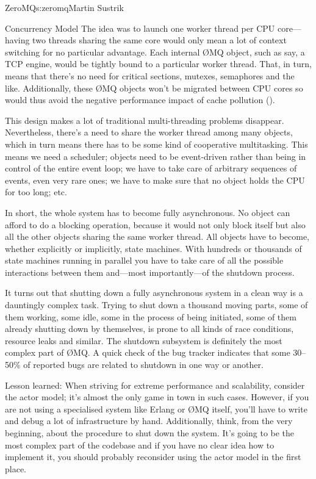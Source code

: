 \begin{aosachapter}{ZeroMQ}{s:zeromq}{Martin Sustrik}
\begin{aosasect1}{Concurrency Model}
The idea was to launch one worker thread per CPU core---having two
threads sharing the same core would only mean a lot of context
switching for no particular advantage. Each internal {\O}MQ object, such
as say, a TCP engine, would be tightly bound to a particular worker
thread. That, in turn, means that there's no need for critical
sections, mutexes, semaphores and the like. Additionally, these {\O}MQ
objects won't be migrated between CPU cores so would thus avoid the
negative performance impact of cache pollution
().


This design makes a lot of traditional multi-threading problems
disappear. Nevertheless, there's a need to share the worker thread
among many objects, which in turn means there has to be some kind of
cooperative multitasking. This means we need a scheduler; objects need 
to be event-driven
rather than being in control of the entire event loop; we have to take
care of arbitrary sequences of events, even very rare ones; we have to
make sure that no object holds the CPU for too long; etc.

In short, the whole system has to become fully asynchronous. No object can
afford to do a blocking operation, because it would not only block
itself but also all the other objects sharing the same worker thread. All
objects have to become, whether explicitly or implicitly, state
machines. With hundreds or thousands of state machines running in
parallel you have to take care of all the possible interactions
between them and---most importantly---of the shutdown process.

It turns out that shutting down a fully asynchronous system in a clean
way is a dauntingly complex task. Trying to shut down a thousand moving
parts, some of them working, some idle, some in the process of being
initiated, some of them already shutting down by themselves, is prone
to all kinds of race conditions, resource leaks and similar. The
shutdown subsystem is definitely the most complex part of {\O}MQ. A quick
check of the bug tracker indicates that some 30--50\% of reported bugs
are related to shutdown in one way or another.

Lesson learned: When striving for extreme performance and scalability,
consider the actor model; it's almost the only game in town in such
cases. However, if you are not using a specialised system like Erlang or
{\O}MQ itself, you'll have to write and debug a lot of infrastructure by
hand. Additionally, think, from the very beginning, about the procedure 
to shut down the system. It's going to be the most complex part of the codebase and
if you have no clear idea how to implement it, you should probably
reconsider using the actor model in the first place.


\end{aosasect1}
\end{aosachapter}
